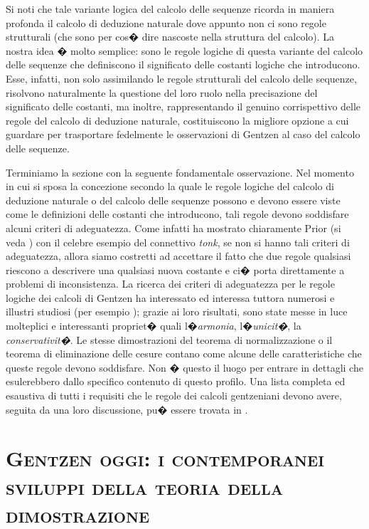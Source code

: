 \documentclass[a4paper,12pt]{aphex}
\begin{document}
Si noti che tale variante logica del calcolo delle sequenze ricorda in maniera profonda il calcolo di deduzione naturale dove appunto non ci sono regole strutturali (che sono per cos� dire nascoste nella struttura del calcolo).  La nostra idea � molto semplice: sono le regole logiche di questa variante del calcolo delle sequenze che definiscono il significato delle costanti logiche che introducono. Esse, infatti, non solo assimilando le regole strutturali del calcolo delle sequenze, risolvono naturalmente la questione del loro ruolo nella precisazione del significato delle costanti, ma inoltre, rappresentando il genuino corrispettivo delle regole del calcolo di deduzione naturale, costituiscono la migliore opzione a cui guardare per trasportare fedelmente le osservazioni di Gentzen al caso del calcolo delle sequenze. 


Terminiamo la sezione con la seguente fondamentale osservazione. Nel momento in cui si sposa la concezione secondo la quale le regole logiche del calcolo di deduzione naturale o del calcolo delle sequenze possono e devono essere viste come le definizioni delle costanti che introducono, tali regole devono soddisfare alcuni criteri di adeguatezza.  Come infatti ha mostrato chiaramente Prior (si veda  \cite{prior}) con il celebre esempio del connettivo \emph{tonk}, se non si hanno tali criteri di adeguatezza, allora siamo costretti ad accettare il fatto che due regole qualsiasi riescono a descrivere una qualsiasi  nuova costante e  ci� porta direttamente a problemi di inconsistenza.
La ricerca dei criteri di adeguatezza per le regole logiche dei calcoli di Gentzen ha interessato ed interessa tuttora numerosi e illustri studiosi (per esempio \cite{dosen, Dummett, Indrezejczak, kremer, wansing}); grazie ai loro risultati, sono state messe in luce molteplici e interessanti propriet� quali l�\emph{armonia}, l�\emph{unicit�}, la \emph{conservativit�}. Le stesse dimostrazioni del teorema di normalizzazione o il teorema di eliminazione delle cesure contano come alcune delle caratteristiche che queste regole devono soddisfare. Non � questo il luogo per entrare in dettagli  che esulerebbero dallo specifico contenuto di questo profilo. Una lista completa ed esaustiva di tutti i requisiti che le regole dei calcoli gentzeniani devono avere, seguita da una loro discussione, pu� essere trovata in \cite{poggiolesi}.


\section{\textsc{Gentzen oggi: i contemporanei sviluppi della teoria della dimostrazione}}
\end{document}
